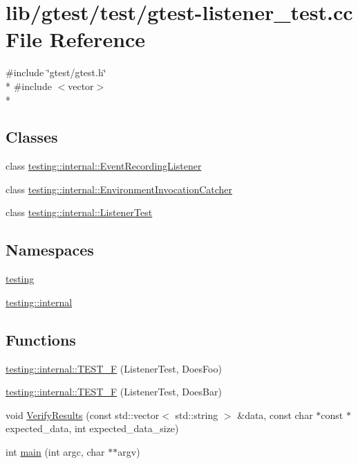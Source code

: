 \hypertarget{gtest-listener__test_8cc}{\section{lib/gtest/test/gtest-\/listener\-\_\-test.cc File Reference}
\label{gtest-listener__test_8cc}
}
{\ttfamily \#include \char`\"{}gtest/gtest.\-h\char`\"{}}\\*
{\ttfamily \#include $<$vector$>$}\\*
\subsection*{Classes}
\begin{DoxyCompactItemize}
\item 
class \hyperlink{classtesting_1_1internal_1_1_event_recording_listener}{testing\-::internal\-::\-Event\-Recording\-Listener}
\item 
class \hyperlink{classtesting_1_1internal_1_1_environment_invocation_catcher}{testing\-::internal\-::\-Environment\-Invocation\-Catcher}
\item 
class \hyperlink{classtesting_1_1internal_1_1_listener_test}{testing\-::internal\-::\-Listener\-Test}
\end{DoxyCompactItemize}
\subsection*{Namespaces}
\begin{DoxyCompactItemize}
\item 
\hyperlink{namespacetesting}{testing}
\item 
\hyperlink{namespacetesting_1_1internal}{testing\-::internal}
\end{DoxyCompactItemize}
\subsection*{Functions}
\begin{DoxyCompactItemize}
\item 
\hyperlink{namespacetesting_1_1internal_a7e113e9c70d45d89fe1703e58ff083b9}{testing\-::internal\-::\-T\-E\-S\-T\-\_\-\-F} (Listener\-Test, Does\-Foo)
\item 
\hyperlink{namespacetesting_1_1internal_a02cef32090020d164460dd3d9f8e2852}{testing\-::internal\-::\-T\-E\-S\-T\-\_\-\-F} (Listener\-Test, Does\-Bar)
\item 
void \hyperlink{gtest-listener__test_8cc_a37b76c7cfb416feefdc2a49fde18db7e}{Verify\-Results} (const std\-::vector$<$ std\-::string $>$ \&data, const char $\ast$const $\ast$expected\-\_\-data, int expected\-\_\-data\-\_\-size)
\item 
int \hyperlink{gtest-listener__test_8cc_a3c04138a5bfe5d72780bb7e82a18e627}{main} (int argc, char $\ast$$\ast$argv)
\end{DoxyCompactItemize}

